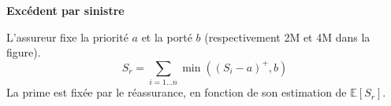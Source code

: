 \begin{f}
\textbf{Excédent par sinistre}
	
L'assureur fixe la priorité \(a\) et la porté \(b\) (respectivement 2M\EUR{} et  4M\EUR{} dans la figure).
\[
S_r= \sum_{i=1\ldots n} \min\left( \left( S_i-a\right)^+,b\right)  
\]
La prime est fixée par le réassurance, en fonction de son estimation de \(\mathbb{E}[S_r]\).


\end{f}
